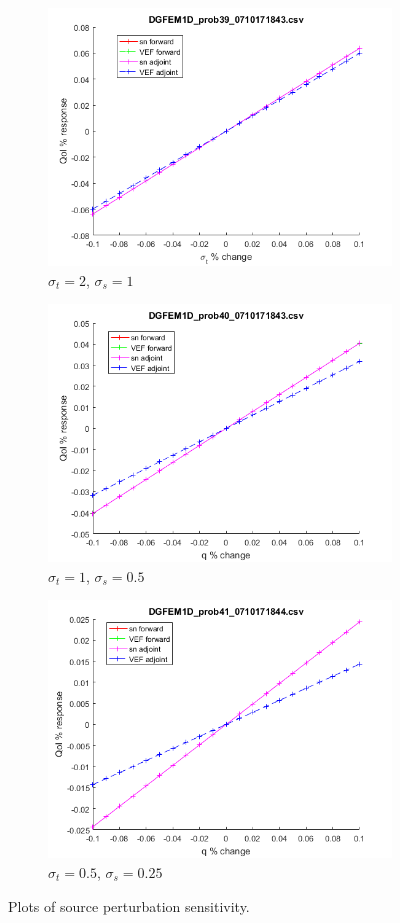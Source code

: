 \documentclass{article}
\newcommand{\sigt}{\sigma_t}
\newcommand{\sigs}{\sigma_s}
\begin{document}
\begin{figure}[H]
\label{InHomoPertq}
\centering
\begin{subfigure}{.5\textwidth}
  \centering
  \includegraphics[width=.8\linewidth]{figures/39qSens.png}
  \caption{$\sigt=2$, $\sigs=1$}
  \label{fig:sfig1}
\end{subfigure}%
\begin{subfigure}{.5\textwidth}
  \centering
  \includegraphics[width=.8\linewidth]{figures/40qSens.png}
  \caption{$\sigt=1$, $\sigs=0.5$}
  \label{fig:sfig2}
\end{subfigure}
\begin{subfigure}{.5\textwidth}
  \centering
  \includegraphics[width=.8\linewidth]{figures/41qSens.png}
  \caption{$\sigt=0.5$, $\sigs=0.25$}
  \label{fig:sfig3}
\end{subfigure}
\caption{Plots of source perturbation sensitivity.}
\label{fig:fig}
\end{figure}
\end{document}

